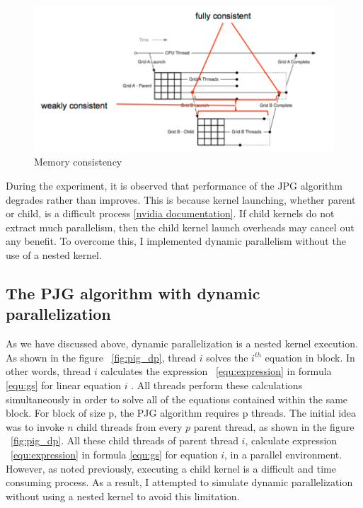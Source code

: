 \documentclass[11pt]{article}       %
\begin{document}
\begin{figure}[h]
 \centering
 \includegraphics[width=1\textwidth]{Figures/figure2}
 \caption{Memory consistency}
 \label{fig2}
\end{figure}

During the experiment, it is observed that performance of the JPG algorithm degrades rather than improves. This is because kernel launching, whether parent or child, is a difficult process \href{https://developer.nvidia.com/blog/cuda-dynamic-parallelism-api-principles/}{[nvidia documentation]}. If child kernels do not extract much parallelism, then the child kernel launch overheads may cancel out any benefit. To overcome this, I implemented dynamic parallelism without the use of a nested kernel.


\subsection{The PJG algorithm with dynamic parallelization} \label{dp}

As we have discussed above, dynamic parallelization is a nested kernel execution.  As shown in the figure ~\ref{fig:pig_dp}, thread $i$ solves the $i^{th}$ equation in block. In other words, thread $i$ calculates the expression ~\ref{equ:expression} in formula \ref{equ:gs} for linear equation $i$ . All threads perform these calculations simultaneously in order to solve all of the equations contained within the same block. For block of size p, the PJG algorithm requires p threads. The initial idea was to invoke $n$ child threads from every $p$ parent thread, as shown in the figure ~\ref{fig:pig_dp}. All these child threads of parent thread $i$, calculate expression ~\ref{equ:expression} in formula \ref{equ:gs} for equation $i$, in a parallel environment. However, as noted previously, executing a child kernel is a difficult and time consuming process. As a result, I attempted to simulate dynamic parallelization without using a nested kernel to avoid this limitation.
\end{document}
